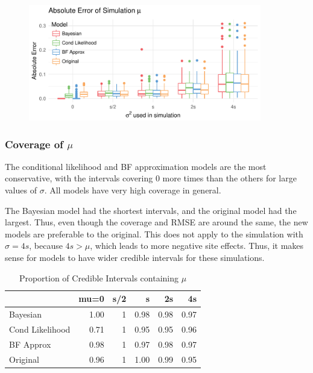 \documentclass[AMA,STIX1COL]{WileyNJD-v2}\usepackage[]{graphicx}\usepackage[]{color}
\newenvironment{knitrout}{}{} %
\begin{document}
\begin{figure}
\begin{knitrout}
\color{fgcolor}

{\centering \includegraphics[width=4in]{figure/unnamed-chunk-21-1} 

}



\end{knitrout}
\end{figure}

\subsubsection{Coverage of $\mu$}

The conditional likelihood and BF approximation models are the most conservative, with the intervals covering 0 more times than the  others for large values of $\sigma$. All models have very high coverage in general.

The Bayesian model had the shortest intervals, and the original model had the largest. Thus, even though the coverage and RMSE are around the same, the new models are preferable to the original. This does not apply to the simulation with $\sigma=4s$, because $4s>\mu$, which leads to more negative site effects. Thus, it makes sense for models to have wider credible intervals for these simulations. 


\begin{knitrout}
\color{fgcolor}\begin{table}

\caption{\label{tab:unnamed-chunk-22}Proportion of Credible Intervals containing $\mu$}
\centering
\begin{tabular}[t]{l|r|r|r|r|r}
\hline
  & mu=0 & s/2 & s & 2s & 4s\\
\hline
Bayesian & 1.00 & 1 & 0.98 & 0.98 & 0.97\\
\hline
Cond Likelihood & 0.71 & 1 & 0.95 & 0.95 & 0.96\\
\hline
BF Approx & 0.98 & 1 & 0.97 & 0.98 & 0.97\\
\hline
Original & 0.96 & 1 & 1.00 & 0.99 & 0.95\\
\hline
\end{tabular}
\end{table}


\end{knitrout}
\end{document}

